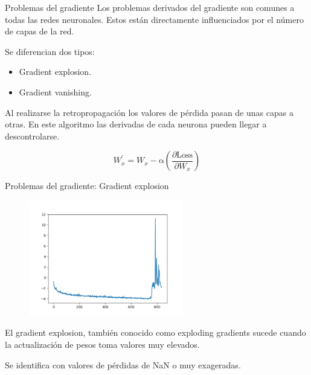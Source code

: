 \begin{frame}{Problemas del gradiente}
Los problemas \alert{derivados del gradiente} son comunes a todas las redes neuronales. Estos están \alert{directamente influenciados} por el número de capas de la red.

Se diferencian dos tipos:
\begin{itemize}
    \item Gradient explosion.
    \item Gradient vanishing.
\end{itemize}

Al realizarse la \alert{retropropagación} los \alert{valores de pérdida} pasan de unas capas a otras. En este algoritmo las derivadas de cada neurona pueden llegar a \alert{descontrolarse}.

\begin{equation}
    W_{x}^{\prime}=W_{x}-\mathrm{\alpha}\left(\frac{\partial \text {Loss}}{\partial W_{x}}\right)
\end{equation}
\end{frame}

\begin{frame}{Problemas del gradiente: Gradient explosion}
\begin{figure}
    \centering
    \includegraphics[width=0.6\textwidth]{Slides/figures/Tema 3/GradientExplosion.png}
    \caption{\cite{GradienExplosion}}
\end{figure}

El \alert{gradient explosion}, también conocido como \alert{exploding gradients} sucede cuando la actualización de pesos toma valores \alert{muy elevados}.

Se identifica con valores de pérdidas de \alert{NaN o muy exageradas}.
\end{frame}

